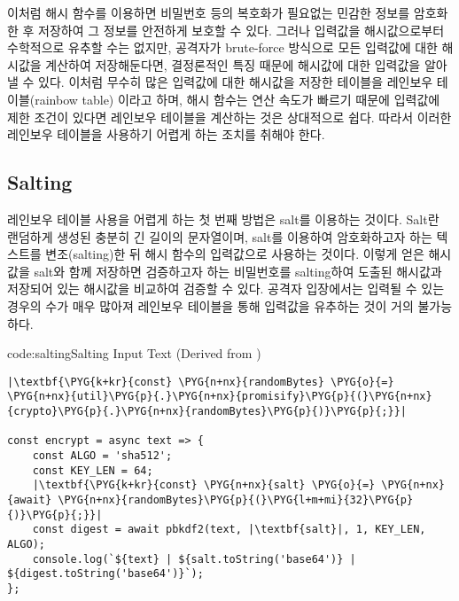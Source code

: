 이처럼 해시 함수를 이용하면 비밀번호 등의 복호화가 필요없는 민감한 정보를 암호화한 후 저장하여 그 정보를 안전하게 보호할 수 있다. 그러나 입력값을 해시값으로부터 수학적으로 유추할 수는 없지만, 공격자가 brute-force 방식으로 모든 입력값에 대한 해시값을 계산하여 저장해둔다면, 결정론적인 특징 때문에 해시값에 대한 입력값을 알아낼 수 있다. 이처럼 무수히 많은 입력값에 대한 해시값을 저장한 테이블을 레인보우 테이블(rainbow table) 이라고 하며, 해시 함수는 연산 속도가 빠르기 때문에 입력값에 제한 조건이 있다면 레인보우 테이블을 계산하는 것은 상대적으로 쉽다. 따라서 이러한 레인보우 테이블을 사용하기 어렵게 하는 조치를 취해야 한다.

\subsection*{Salting}

레인보우 테이블 사용을 어렵게 하는 첫 번째 방법은 salt를 이용하는 것이다. Salt란 랜덤하게 생성된 충분히 긴 길이의 문자열이며, salt를 이용하여 암호화하고자 하는 텍스트를 변조(salting)한 뒤 해시 함수의 입력값으로 사용하는 것이다. 이렇게 얻은 해시값을 salt와 함께 저장하면 검증하고자 하는 비밀번호를 salting하여 도출된 해시값과 저장되어 있는 해시값을 비교하여 검증할 수 있다. 공격자 입장에서는 입력될 수 있는 경우의 수가 매우 많아져 레인보우 테이블을 통해 입력값을 유추하는 것이 거의 불가능하다.

\begin{code}{code:salting}{Salting Input Text (Derived from )}
\begin{verbatim}
|\textbf{\PYG{k+kr}{const} \PYG{n+nx}{randomBytes} \PYG{o}{=} \PYG{n+nx}{util}\PYG{p}{.}\PYG{n+nx}{promisify}\PYG{p}{(}\PYG{n+nx}{crypto}\PYG{p}{.}\PYG{n+nx}{randomBytes}\PYG{p}{)}\PYG{p}{;}}|

const encrypt = async text => {
    const ALGO = 'sha512';
    const KEY_LEN = 64;
    |\textbf{\PYG{k+kr}{const} \PYG{n+nx}{salt} \PYG{o}{=} \PYG{n+nx}{await} \PYG{n+nx}{randomBytes}\PYG{p}{(}\PYG{l+m+mi}{32}\PYG{p}{)}\PYG{p}{;}}|
    const digest = await pbkdf2(text, |\textbf{salt}|, 1, KEY_LEN, ALGO);
    console.log(`${text} | ${salt.toString('base64')} | ${digest.toString('base64')}`);
};
\end{verbatim}
\end{code}



